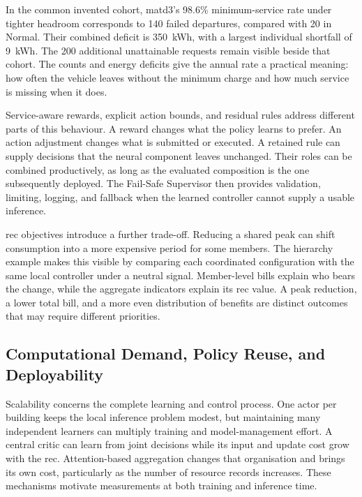

\illustrativereading In the common invented cohort, \gls{matd3}'s 98.6\% minimum-service rate under tighter headroom corresponds to 140 failed departures, compared with 20 in Normal. Their combined deficit is 350~kWh, with a largest individual shortfall of 9~kWh. The 200 additional unattainable requests remain visible beside that cohort. The counts and energy deficits give the annual rate a practical meaning: how often the vehicle leaves without the minimum charge and how much service is missing when it does.

Service-aware rewards, explicit action bounds, and residual rules address different parts of this behaviour. A reward changes what the policy learns to prefer. An action adjustment changes what is submitted or executed. A retained rule can supply decisions that the neural component leaves unchanged. Their roles can be combined productively, as long as the evaluated composition is the one subsequently deployed. The Fail-Safe Supervisor then provides validation, limiting, logging, and fallback when the learned controller cannot supply a usable inference.

\gls{rec} objectives introduce a further trade-off. Reducing a shared peak can shift consumption into a more expensive period for some members. The hierarchy example makes this visible by comparing each coordinated configuration with the same local controller under a neutral signal. Member-level bills explain who bears the change, while the aggregate indicators explain its \gls{rec} value. A peak reduction, a lower total bill, and a more even distribution of benefits are distinct outcomes that may require different priorities.

\subsection{Computational Demand, Policy Reuse, and Deployability}

Scalability concerns the complete learning and control process. One actor per building keeps the local inference problem modest, but maintaining many independent learners can multiply training and model-management effort. A central critic can learn from joint decisions while its input and update cost grow with the \gls{rec}. Attention-based aggregation changes that organisation and brings its own cost, particularly as the number of resource records increases. These mechanisms motivate measurements at both training and inference time.

